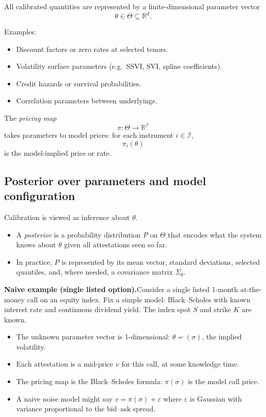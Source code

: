 \documentclass[11pt,a4paper]{article}
\begin{document}
All calibrated quantities are represented by a finite-dimensional parameter vector
\[
    \theta \in \Theta \subseteq \mathbb{R}^d.
\]

Examples:
\begin{itemize}
    \item Discount factors or zero rates at selected tenors.
    \item Volatility surface parameters (e.g.\ SSVI, SVI, spline coefficients).
    \item Credit hazards or survival probabilities.
    \item Correlation parameters between underlyings.
\end{itemize}

The \textit{pricing map}
\[
    \pi : \Theta \to \mathbb{R}^{\mathcal{I}}
\]
takes parameters to model prices: for each instrument $i \in \mathcal{I}$,
\[
    \pi_i(\theta)
\]
is the model-implied price or rate.

\subsection{Posterior over parameters and model configuration}

Calibration is viewed as inference about $\theta$.
\begin{itemize}
    \item A \textit{posterior} is a probability distribution $P$ on $\Theta$ that encodes what the system knows about $\theta$ given all attestations seen so far.
    \item In practice, $P$ is represented by its mean vector, standard deviations, selected quantiles, and, where needed, a covariance matrix $\Sigma_\theta$.
\end{itemize}

\textbf{Naive example (single listed option).}\quad Consider a single listed 1-month at-the-money call on an equity index. Fix a simple model: Black--Scholes with known interest rate and continuous dividend yield. The index spot $S$ and strike $K$ are known.
\begin{itemize}
    \item The unknown parameter vector is 1-dimensional: $\theta = (\sigma)$, the implied volatility.
    \item Each attestation is a mid-price $v$ for this call, at some knowledge time.
    \item The pricing map is the Black--Scholes formula: $\pi(\sigma)$ is the model call price.
    \item A naive noise model might say $v = \pi(\sigma) + \varepsilon$ where $\varepsilon$ is Gaussian with variance proportional to the bid--ask spread.
\end{itemize}
\end{document}
